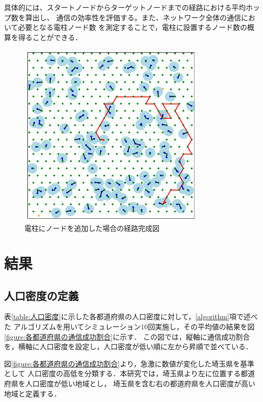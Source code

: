 \documentclass[a4paper, 11pt]{ltjsarticle}
\begin{document}
\begin{enumerate}[label=\textbf{(\arabic*)}]
  具体的には、スタートノードからターゲットノードまでの経路における平均ホップ数を算出し、
  通信の効率性を評価する。また、ネットワーク全体の通信において必要となる電柱ノード数
  を測定することで，電柱に設置するノード数の概算を得ることができる．

  \begin{figure}[h]
    \centering
    \includegraphics[width=90mm]{福島_2_step.png}
    \caption{電柱にノードを追加した場合の経路完成図}
    \label{figure:福島_2_step}
  \end{figure}
\end{enumerate}

\clearpage
\section{結果}
\subsection{人口密度の定義}
表\ref{table:人口密度}に示した各都道府県の人口密度に対して，\ref{algorithm}項で述べた
アルゴリズムを用いてシミュレーション10回実施し，その平均値の結果を図\ref{figure:各都道府県の通信成功割合}に示す．
この図では，縦軸に通信成功割合を，横軸に人口密度を設定し，人口密度が低い順に左から昇順で並べている．

図\ref{figure:各都道府県の通信成功割合}より，急激に数値が変化した埼玉県を基準として
人口密度の高低を分類する．本研究では，埼玉県より左に位置する都道府県を人口密度が低い地域とし，
埼玉県を含む右の都道府県を人口密度が高い地域と定義する．
\end{document}
